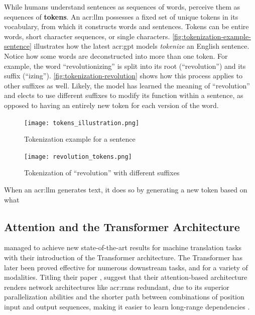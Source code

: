 While humans understand sentences as sequences of words,  perceive them as sequences of \textbf{tokens}. An \acrshort{acr:llm} possesses a fixed set of unique tokens in its vocabulary, from which it constructs words and sentences. Tokens can be entire words, short character sequences, or single characters. \autoref{fig:tokenization-example-sentence} illustrates how the latest \acrshort{acr:gpt} models \textit{tokenize} an English sentence. Notice how some words are deconstructed into more than one token. For example, the word \enquote{revolutionizing} is split into its root (\enquote{revolution}) and its suffix (\enquote{izing}). \autoref{fig:tokenization-revolution} shows how this process applies to other suffixes as well. Likely, the model has learned the meaning of \enquote{revolution} and elects to use different suffixes to modify its function within a sentence, as opposed to having an entirely new token for each version of the word.

\begin{figure}[htp]
    \centering
    \texttt{[image: tokens\_illustration.png]}
    \caption{Tokenization example for a sentence}
    \label{fig:tokenization-example-sentence}
\end{figure}

\begin{figure}[htp]
    \centering
    \texttt{[image: revolution\_tokens.png]}
    \caption{Tokenization of \enquote{revolution} with different suffixes}
    \label{fig:tokenization-revolution}
\end{figure}

When an \acrshort{acr:llm} generates text, it does so by generating a new token based on what

\subsection{Attention and the Transformer Architecture}
\label{subsec:attention-and-the-transformer-architecture}

\cite{vaswaniAttentionAllYou2017} managed to achieve new state-of-the-art results for machine translation tasks with their introduction of the Transformer architecture. The Transformer has later been proved effective for numerous downstream tasks, and for a variety of modalities. Titling their paper , \citeauthor{vaswaniAttentionAllYou2017} suggest that their attention-based architecture renders network architectures like \glspl{acr:rnn} redundant, due to its superior parallelization abilities and the shorter path between combinations of position input and output sequences, making it easier to learn long-range dependencies \citep[6]{vaswaniAttentionAllYou2017}.

